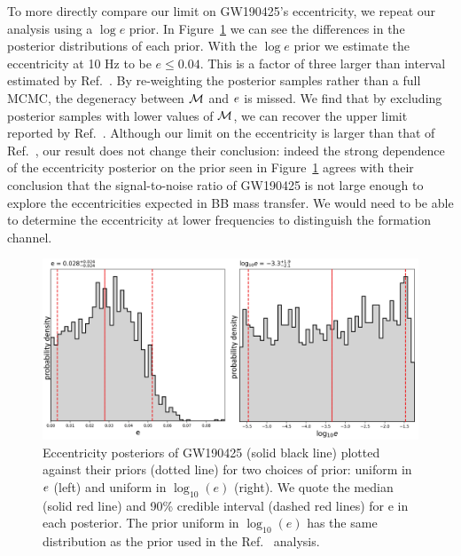 To more directly compare our limit on GW190425's eccentricity, we repeat our analysis using a $\log e$ prior. In Figure~\ref{Fig:1DMarginal} we can see the differences in the posterior distributions of each prior. With the $\log e$ prior we estimate the eccentricity at 10 Hz to be $e \leq 0.04$. This is a factor of three larger than interval estimated by Ref.~\cite{10.1093/mnrasl/slaa084}. By re-weighting the posterior samples rather than a full MCMC, the degeneracy between $\mathcal{M}$ and $e$ is missed. We find that by excluding posterior samples with lower values of $\mathcal{M}$, we can recover the upper limit reported by Ref.~\cite{10.1093/mnrasl/slaa084}. Although our limit on the eccentricity is larger than that of Ref.~\cite{10.1093/mnrasl/slaa084}, our result does not change their conclusion: indeed the strong dependence of the eccentricity posterior on the prior seen in Figure~\ref{Fig:1DMarginal} agrees with their conclusion that the signal-to-noise ratio of GW190425 is not large enough to explore the eccentricities expected in BB mass transfer. We would need to be able to determine the eccentricity at lower frequencies to distinguish the formation channel.

\begin{figure}
    \includegraphics[width=\textwidth]{Figures/bns-pe/1Dmarginal-eccen-10hz.png}
    \caption{Eccentricity posteriors of GW190425 (solid black line) plotted against their priors (dotted line) for two choices of prior: uniform in $e$ (left) and uniform in $\log_{10}(e)$ (right). We quote the median (solid red line) and 90\% credible interval (dashed red lines) for e in each posterior. The prior uniform in $\log_{10}(e)$ has the same distribution as the prior used in the Ref.~\protect\cite{10.1093/mnrasl/slaa084} analysis.}
    \label{Fig:1DMarginal}
\end{figure}

